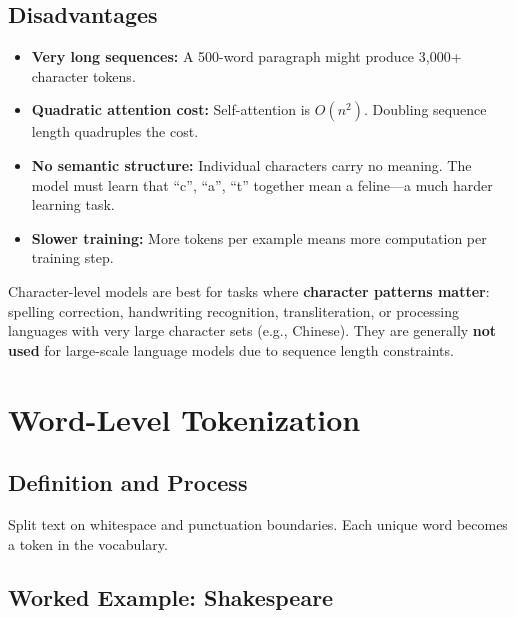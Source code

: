 \documentclass[11pt,a4paper]{article}
\begin{document}
\subsection{Disadvantages}

\begin{itemize}[leftmargin=1.5em]
    \item \textbf{Very long sequences:} A 500-word paragraph might produce 3,000+ character tokens.
    \item \textbf{Quadratic attention cost:} Self-attention is $O(n^2)$. Doubling sequence length quadruples the cost.
    \item \textbf{No semantic structure:} Individual characters carry no meaning. The model must learn that ``c'', ``a'', ``t'' together mean a feline---a much harder learning task.
    \item \textbf{Slower training:} More tokens per example means more computation per training step.
\end{itemize}

\begin{tcolorbox}[intuitionbox={When to Use Character-Level Tokenization}]
Character-level models are best for tasks where \textbf{character patterns matter}: spelling correction, handwriting recognition, transliteration, or processing languages with very large character sets (e.g., Chinese). They are generally \textbf{not used} for large-scale language models due to sequence length constraints.
\end{tcolorbox}

\section{Word-Level Tokenization}

\subsection{Definition and Process}

Split text on whitespace and punctuation boundaries. Each unique word becomes a token in the vocabulary.

\subsection{Worked Example: Shakespeare}
\end{document}
